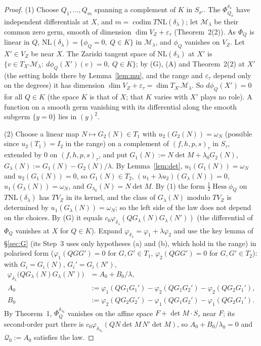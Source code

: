 \documentclass[11pt]{article}
\numberwithin{equation}{section}
\theoremstyle{remark}
\newcommand{\NL}{\mathrm{NL}}
\newcommand{\VZ}{V_Z}
\newcommand{\cM}{\mathcal{M}}
\newcommand{\Hess}{\operatorname{Hess}}
\newcommand{\codim}{\operatorname{codim}}
\newcommand{\lz}{\lambda_0}
\newcommand{\et}{\varepsilon_\tau}
\begin{document}
\begin{proof}
(1) Choose $Q_1,\dots,Q_m$ spanning a complement of $K$ in $S_{\sigma'}$. The $\Phi^{\delta_\lambda}_{Q_a}$ have
independent differentials at $X$, and $m=\codim T\NL(\delta_\lambda)$; let $\cM_\lambda$ be their common zero germ,
smooth of dimension $\dim\VZ+\et$ (Theorem~2(2)). As $\Phi_Q$ is linear in $Q$,
$\NL(\delta_\lambda)=\{\phi_Q=0,\ Q\in K\}$ in $\cM_\lambda$, and $\phi_Q$ vanishes on $\VZ$. Let $X'\in\VZ$ be near
$X$. The Zariski tangent space of $\NL(\delta_\lambda)$ at $X'$ is $\{v\in T_{X'}\cM_\lambda:\ d\phi_Q(X')(v)=0,\ Q\in K\}$;
by (G), (A) and Theorem~2(2) at $X'$ (the setting holds there by Lemma~\ref{lem:mu}, and the range and $\et$
depend only on the degrees) it has dimension $\dim\VZ+\et=\dim T_{X'}\cM_\lambda$. So $d\phi_Q(X')=0$ for all
$Q\in K$ (the space $K$ is that of $X$; that $K$ varies with $X'$ plays no role). A function on a smooth germ
vanishing with its differential along the smooth subgerm $\{y=0\}$ lies in $(y)^2$.

(2) Choose a linear map $N\mapsto G_2(N)\in T_1$ with $u_2(G_2(N))=\omega_N$ (possible since $u_2(T_1)=I_2$ in
the range) on a complement of $(f,h,p,s)_\tau$ in $S_\tau$, extended by $0$ on $(f,h,p,s)_\tau$, and put $G_1(N):=N\det M+\lz G_2(N)$,
$G_\lambda(N):=G_1(N)-G_2(N)/\lambda$. By Lemma~\ref{lem:det}, $u_1(G_1(N))=\omega_N$ and $u_2(G_1(N))=0$, so
$G_1(N)\in T_2$, $(u_1+\lambda u_2)(G_\lambda(N))=0$, $u_1(G_\lambda(N))=\omega_N$, and $G_{\lz}(N)=N\det M$. By (1)
the form $\tfrac12\Hess\phi_Q$ on $T\NL(\delta_\lambda)$ has $T\VZ$ in its kernel, and the class of $G_\lambda(N)$
modulo $T\VZ$ is determined by $u_1(G_\lambda(N))=\omega_N$; so the left side of the law does not depend on the
choices. By (G) it equals $c_0\varphi_{\delta_\lambda}(QG_\lambda(N)G_\lambda(N'))$ (the differential of
$\Phi_Q$ vanishes at $X$ for $Q\in K$). Expand $\varphi_{\delta_\lambda}=\varphi_1+\lambda\varphi_2$ and use the key
lemma of \S\ref{sec:G} (its Step~3 uses only hypotheses (a) and (b), which hold in the range) in polarised form ($\varphi_1(QGG')=0$ for $G,G'\in T_1$, $\varphi_2(QGG')=0$ for
$G,G'\in T_2$): with $G_i=G_i(N)$, $G_i'=G_i(N')$,
\begin{align*}
\varphi_{\delta_\lambda}\bigl(QG_\lambda(N)G_\lambda(N')\bigr)&=A_0+B_0/\lambda,\\
A_0&:=\varphi_1(QG_1G_1')-\varphi_2(QG_1G_2')-\varphi_2(QG_2G_1'),\\
B_0&:=\varphi_2(QG_2G_2')-\varphi_1(QG_1G_2')-\varphi_1(QG_2G_1').
\end{align*}
By Theorem~1, $\Phi^{\delta_{\lz}}_Q$ vanishes on the affine space $F+\det M\cdot S_\tau$ near $F$; its second-order
part there is $c_0\varphi_{\delta_{\lz}}(QN\det M\,N'\det M)$, so $A_0+B_0/\lz=0$ and
$\mathcal Q_0:=A_0$ satisfies the law.


\end{proof}
\end{document}
